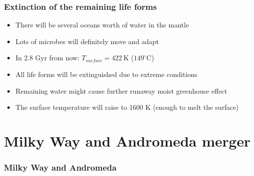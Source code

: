 \documentclass[aspectratio=169]{beamer}
\begin{document}
\begin{frame}
\frametitle{Extinction of the remaining life forms}
\begin{itemize}
\item There will be several oceans worth of water in the mantle \cite{Bounama}
\item Lots of microbes will definitely move and adapt
\item In 2.8 Gyr from now: $T_{surface} = 422 \: \mathrm{K}$ ($149^\circ \mathrm{C}$)
\item All life forms will be extinguished due to extreme conditions
\item Remaining water might cause further runaway moist greenhouse effect
\item The surface temperature will raise to 1600 K (enough to melt the surface)
\end{itemize}
\end{frame}

\section{Milky Way and Andromeda merger}
\begin{frame}
\frametitle{Milky Way and Andromeda}
\end{frame}
\end{document}
